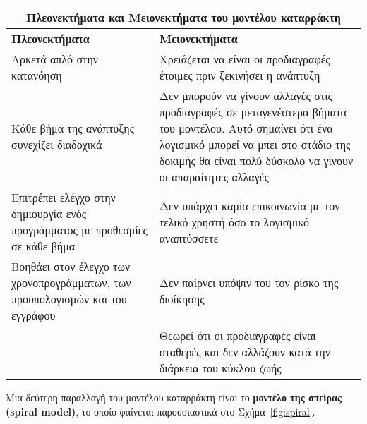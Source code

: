\newpage
\begin{center}
    \begin{tabular}{| p{8cm} | p{8cm} |}
        \hline
        \multicolumn{2}{|c|}{\textbf{Πλεονεκτήματα και Μειονεκτήματα του μοντέλου καταρράκτη}} \\
        \hline
        \textbf{Πλεονεκτήματα} & \textbf{Μειονεκτήματα} \\
        \hline
        Αρκετά απλό στην κατανόηση & Χρειάζεται να είναι οι προδιαγραφές έτοιμες πριν ξεκινήσει η ανάπτυξη \\
        \hline
        Κάθε βήμα της ανάπτυξης συνεχίζει διαδοχικά & Δεν μπορούν να γίνουν αλλαγές στις προδιαγραφές σε μεταγενέστερα βήματα του μοντέλου. Αυτό σημαίνει ότι ένα λογισμικό μπορεί να μπει στο στάδιο της δοκιμής θα είναι πολύ δύσκολο να γίνουν οι απαραίτητες αλλαγές \\
        \hline
        Επιτρέπει ελέγχο στην δημιουργία ενός προγράμματος με προθεσμίες σε κάθε βήμα & Δεν υπάρχει καμία επικοινωνία με τον τελικό χρηστή όσο το λογισμικό αναπτύσσετε \\
        \hline
        Βοηθάει στον έλεγχο των χρονοπρογράμματων, των προϋπολογισμών  και του εγγράφου & Δεν παίρνει υπόψιν του τον ρίσκο της διοίκησης \\
        \hline
        & Θεωρεί ότι οι προδιαγραφές είναι σταθερές και δεν αλλάζουν κατά την διάρκεια του κύκλου ζωής  \\
        \hline
    \end{tabular}
\end{center}

Μια δεύτερη παραλλαγή του μοντέλου καταρράκτη είναι το \textbf{μοντέλο της σπείρας (spiral model)}, το οποίο φαίνεται παρουσιαστικά στο Σχήμα~\ref{fig:spiral}.


